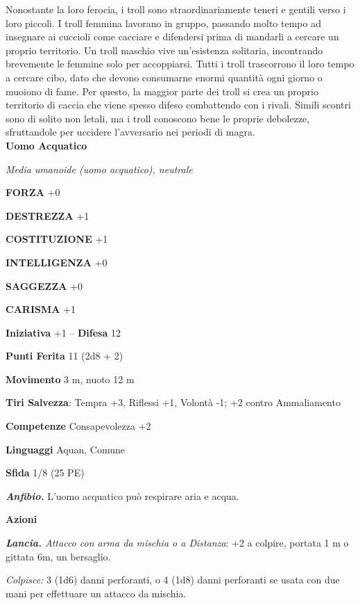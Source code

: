 \begin{multicols}{2}
Nonostante la loro ferocia, i troll sono straordinariamente teneri e gentili verso i loro piccoli. I troll femmina lavorano in gruppo, passando molto tempo ad insegnare ai cuccioli come cacciare e difendersi prima di mandarli a cercare un proprio territorio. Un troll maschio vive un'esistenza solitaria, incontrando brevemente le femmine solo per accoppiarsi. Tutti i troll trascorrono il loro tempo a cercare cibo, dato che devono consumarne enormi quantità ogni giorno o muoiono di fame. Per questo, la maggior parte dei troll si crea un proprio territorio di caccia che viene spesso difeso combattendo con i rivali. Simili scontri sono di solito non letali, ma i troll conoscono bene le proprie debolezze, sfruttandole per uccidere l'avversario nei periodi di magra.\\


\medskip{}\textbf{Uomo Acquatico}

\emph{Media umanoide (uomo acquatico), neutrale}

\textbf{FORZA} +0

\textbf{DESTREZZA} +1

\textbf{COSTITUZIONE} +1

\textbf{INTELLIGENZA} +0

\textbf{SAGGEZZA} +0

\textbf{CARISMA} +1

\textbf{Iniziativa} +1 -- \textbf{Difesa} 12

\textbf{Punti Ferita} 11 (2d8 + 2)

\textbf{Movimento} 3 m, nuoto 12 m

\textbf{Tiri Salvezza}:  Tempra +3, Riflessi +1, Volontà -1; +2 contro Ammaliamento

\textbf{Competenze} Consapevolezza +2

\textbf{Linguaggi} Aquan, Comune

\textbf{Sfida} 1/8 (25 PE)

\emph{\textbf{Anfibio.}} L'uomo acquatico può respirare aria e acqua.

\textbf{Azioni}

\emph{\textbf{Lancia.} Attacco con arma da mischia o a Distanza}: +2 a colpire, portata 1 m o gittata 6m, un bersaglio.

\emph{Colpisce:} 3 (1d6) danni perforanti, o 4 (1d8) danni perforanti se
usata con due mani per effettuare un attacco da mischia.


\end{multicols}
